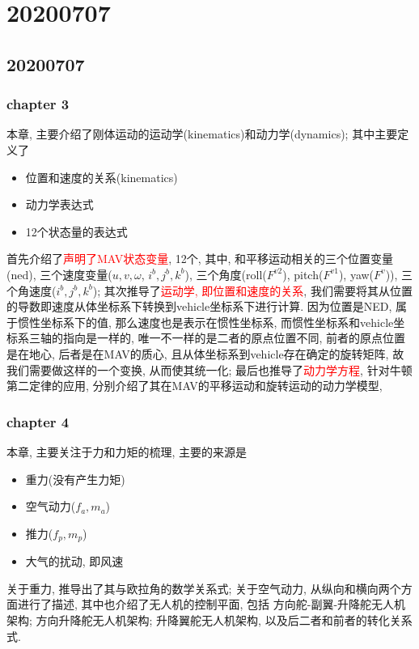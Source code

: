   \chapter{20200707}
    \section{20200707}
        \subsection{chapter 3}
        本章, 主要介绍了刚体运动的运动学(kinematics)和动力学(dynamics); 其中主要定义了
        \begin{itemize}
          \item 位置和速度的关系(kinematics)
          \item 动力学表达式
          \item 12个状态量的表达式
        \end{itemize}
        首先介绍了\textcolor{red}{声明了MAV状态变量}, 12个, 
        其中, 和平移运动相关的三个位置变量(ned), 
        三个速度变量($u, v, \omega$, $i^{b}, j^{b}, k^{b}$), 
        三个角度(roll($F^{v2}$), pitch($F^{v1}$), yaw($F^{v}$)), 
        三个角速度($i^{b}, j^{b}, k^{b}$); 
        其次推导了\textcolor{red}{运动学, 即位置和速度的关系}, 
        我们需要将其从位置的导数即速度从体坐标系下转换到vehicle坐标系下进行计算.  
        因为位置是NED, 属于惯性坐标系下的值, 那么速度也是表示在惯性坐标系, 而惯性坐标系和vehicle坐标系三轴的指向是一样的, 唯一不一样的是二者的原点位置不同, 前者的原点位置是在地心, 后者是在MAV的质心, 且从体坐标系到vehicle存在确定的旋转矩阵, 故我们需要做这样的一个变换, 从而使其统一化;
        最后也推导了\textcolor{red}{动力学方程}, 针对牛顿第二定律的应用, 分别介绍了其在MAV的平移运动和旋转运动的动力学模型,
        \subsection{chapter 4}
        本章, 主要关注于力和力矩的梳理, 主要的来源是
        \begin{itemize}
          \item 重力(没有产生力矩)
          \item 空气动力($f_{a}, m_{a}$)
          \item 推力($f_{p}, m_{p}$)
          \item 大气的扰动, 即风速
        \end{itemize}
        关于重力, 推导出了其与欧拉角的数学关系式; 关于空气动力, 从纵向和横向两个方面进行了描述, 其中也介绍了无人机的控制平面, 包括 方向舵-副翼-升降舵无人机架构; 方向升降舵无人机架构; 升降翼舵无人机架构, 以及后二者和前者的转化关系式. 
    \clearpage
